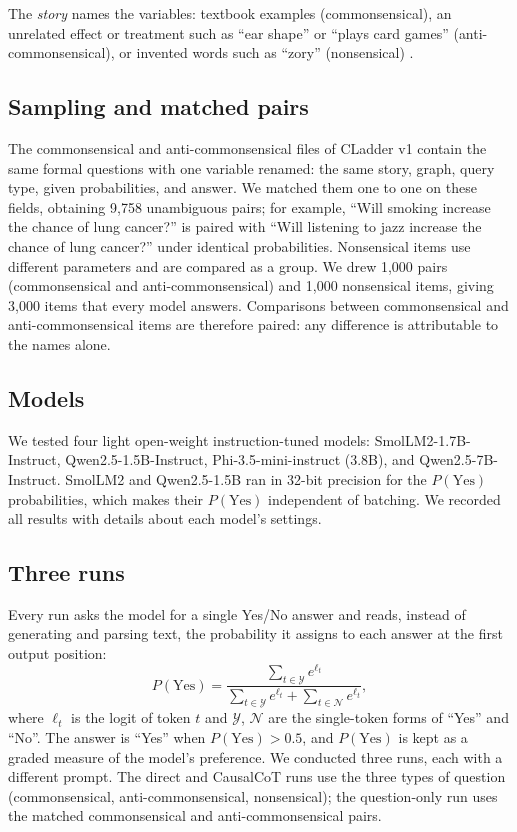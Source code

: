 \documentclass{llncs}
\begin{document}
The \emph{story} names the variables: textbook examples (\textcolor{cComm}{commonsensical}), an unrelated effect or treatment such as ``ear shape'' or ``plays card games'' (\textcolor{cAnti}{anti-commonsensical}), or invented words such as ``zory'' (\textcolor{cNons}{nonsensical}) \cite{jin2023cladder}.

\subsection{Sampling and matched pairs}
\label{sec:sampling}

The commonsensical and anti-commonsensical files of CLadder v1 contain the same formal questions with one variable renamed: the same story, graph, query type, given probabilities, and answer. We matched them one to one on these fields, obtaining 9,758 unambiguous pairs; for example, ``Will smoking increase the chance of lung cancer?'' is paired with ``Will listening to jazz increase the chance of lung cancer?'' under identical probabilities. Nonsensical items use different parameters and are compared as a group. We drew 1,000 pairs (commonsensical and anti-commonsensical) and 1,000 nonsensical items, giving 3,000 items that every model answers. Comparisons between commonsensical and anti-commonsensical items are therefore paired: any difference is attributable to the names alone.

\subsection{Models}
\label{sec:models}

We tested four light open-weight instruction-tuned models: SmolLM2-1.7B-Instruct, Qwen2.5-1.5B-Instruct, Phi-3.5-mini-instruct (3.8B), and Qwen2.5-7B-Instruct. SmolLM2 and Qwen2.5-1.5B ran in 32-bit precision for the $P(\text{Yes})$ probabilities, which makes their $P(\text{Yes})$ independent of batching.  We recorded all results with details about each model's settings.

\subsection{Three runs}
\label{sec:runs}

Every run asks the model for a single Yes/No answer and reads, instead of generating and parsing text, the probability it assigns to each answer at the first output position:
\[
P(\text{Yes}) = \frac{\sum_{t \in \mathcal{Y}} e^{\ell_t}}{\sum_{t \in \mathcal{Y}} e^{\ell_t} + \sum_{t \in \mathcal{N}} e^{\ell_t}},
\]
where $\ell_t$ is the logit of token $t$ and $\mathcal{Y}$, $\mathcal{N}$ are the single-token forms of ``Yes'' and ``No''. The answer is ``Yes'' when $P(\text{Yes}) > 0.5$, and $P(\text{Yes})$ is kept as a graded measure of the model's preference. We conducted three runs, each with a different prompt. The direct and CausalCoT runs use the three types of question (commonsensical, anti-commonsensical, nonsensical); the question-only run uses the matched commonsensical and anti-commonsensical pairs.
\end{document}
